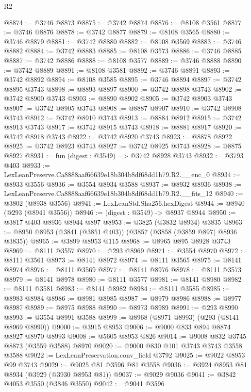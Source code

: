\begin{lexlean}{R2}
\begin{coremodule}
@8874 := @3746 @8873
@8875 := @3742 @8874
@8876 := @8108 @3561
@8877 := @3746 @8876
@8878 := @3742 @8877
@8879 := @8108 @3565
@8880 := @3746 @8879
@8881 := @3742 @8880
@8882 := @8108 @3569
@8883 := @3746 @8882
@8884 := @3742 @8883
@8885 := @8108 @3573
@8886 := @3746 @8885
@8887 := @3742 @8886
@8888 := @8108 @3577
@8889 := @3746 @8888
@8890 := @3742 @8889
@8891 := @8108 @3581
@8892 := @3746 @8891
@8893 := @3742 @8892
@8894 := @8108 @3585
@8895 := @3746 @8894
@8897 := @3742 @8895 @3743
@8898 := @8893 @8897
@8900 := @3742 @8898 @3743
@8902 := @3742 @8900 @3743
@8903 := @8890 @8902
@8905 := @3742 @8903 @3743
@8907 := @3742 @8905 @3743
@8908 := @8887 @8907
@8910 := @3742 @8908 @3743
@8912 := @3742 @8910 @3743
@8913 := @8884 @8912
@8915 := @3742 @8913 @3743
@8917 := @3742 @8915 @3743
@8918 := @8881 @8917
@8920 := @3742 @8918 @3743
@8922 := @3742 @8920 @3743
@8923 := @8878 @8922
@8925 := @3742 @8923 @3743
@8927 := @3742 @8925 @3743
@8928 := @8875 @8927
@8931 := fun (digest : @3549) => @3742 @8928 @3743
@8932 := @3793 @403
@8933 := LexLeanPreserve.Ca8888aaf66639e18b304b8df68dd1b79.R2.__enc_0
@8934 := @8933 @3556
@8936 := @3554 @8934 @3588
@8937 := @8932 @8936
@8938 := LexLeanPreserve.Ca8888aaf66639e18b304b8df68dd1b79.R2.__fits_12
@8940 := @3802 (@8938 @3556)
@8941 := LexLeanStd.Sha256.hexDigest
@8944 := @8940 (@293 (@8941 @3556))
@8946 := (digest : @3549) -> @8937 @8944
@8950 := @3817 @403 @8936 @8944 @897
@8953 := @3825 (@3832 @8934) @3835
@8963 := @8950 @8953 (@3841 (@3851 @403)) (@3857 (@3858 (@3859 @897) @8936 @3835))
@8965 := @3899 @8953 @115
@8968 := @8965 @895 @8928 @3743
@8969 := @8111 @3557
@8970 := @293 @8969
@8971 := @3554 @8970
@8972 := @8111 @3561
@8973 := @8141 @8972
@8974 := @8111 @3565
@8975 := @8141 @8974
@8976 := @8111 @3569
@8977 := @8141 @8976
@8978 := @8111 @3573
@8979 := @8141 @8978
@8980 := @8111 @3577
@8981 := @8141 @8980
@8982 := @8111 @3581
@8983 := @8141 @8982
@8984 := @8111 @3585
@8985 := @8983 @8984
@8986 := @8981 @8985
@8987 := @8979 @8986
@8988 := @8977 @8987
@8989 := @8975 @8988
@8990 := @8973 @8989
@8991 := @293 @8990
@8993 := @3554 @8991 @3588
@8999 := @8968 (@8971 @8993) (@293 (@8141 @8969 @8990))
@9000 := @3915 @8953
@9006 := @9000 @833 @894 @8874 @8927 @8970 @8993
@9008 := @5605 @8953 @826
@9014 := @9008 @832 @3745 @8873 (@3559 @3588) @8970
@9020 := @9000 @830 @101 @3743 @3743 @3558 @3588
@9022 := LexLeanPreservation.conv_field @3792
@9025 := @9022 @8953 @99 @3743
@9029 := @9025 @81 @3596 @81 @3558
@9036 := @3924 @8953 @81 @8934 (@3929 (@3930 @8953 @81))
@9037 := @9029 @9036
@9041 := @3842 @4053 @3550 (@3846 @3550)
@9042 := @9041 @3596

\end{coremodule}
\end{lexlean}
